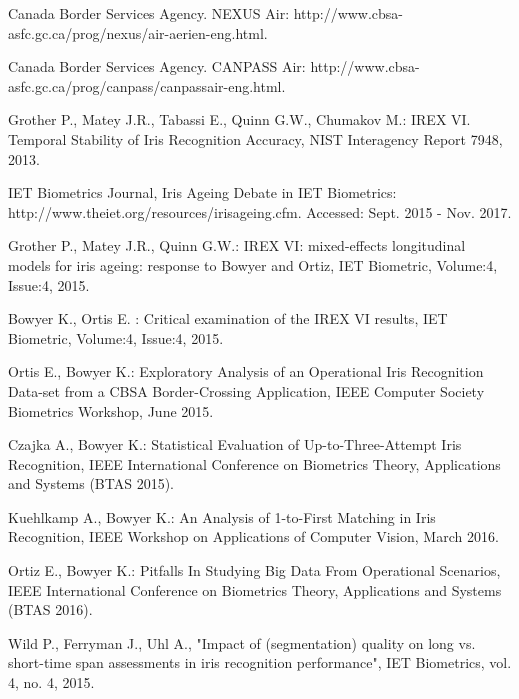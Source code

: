 
\begin{thebibliography}{9}



Canada Border Services Agency. NEXUS Air:
http://www.cbsa-asfc.gc.ca/prog/nexus/air-aerien-eng.html.

\bibitem{[kn:CANPASS]}
Canada Border Services Agency. CANPASS Air: 
http://www.cbsa-asfc.gc.ca/prog/canpass/canpassair-eng.html.


		Grother P., Matey J.R.,  Tabassi E., Quinn G.W., Chumakov M.: 
IREX VI. Temporal Stability of Iris Recognition Accuracy, NIST Interagency Report 7948, 2013.

IET Biometrics Journal, Iris Ageing Debate in IET Biometrics: http://www.theiet.org/resources/irisageing.cfm. 
Accessed:  Sept. 2015 - Nov. 2017.

		Grother P., Matey J.R., Quinn G.W.: 
IREX VI: mixed-effects longitudinal models for iris ageing: response to Bowyer and Ortiz, IET Biometric,  Volume:4, Issue:4, 2015.

		Bowyer K., Ortis E. : Critical examination of the IREX VI results,  IET Biometric,  Volume:4, Issue:4, 2015.



		Ortis E.,  Bowyer K.: Exploratory Analysis of an Operational Iris Recognition Data-set from a CBSA Border-Crossing Application, IEEE Computer Society Biometrics Workshop, June 2015.


		Czajka A., Bowyer K.: Statistical Evaluation of Up-to-Three-Attempt Iris Recognition, IEEE International Conference on Biometrics Theory, Applications and Systems (BTAS 2015).

		Kuehlkamp A., Bowyer K.: An Analysis of 1-to-First Matching in Iris Recognition, IEEE Workshop on Applications of Computer Vision, March 2016. 

	Ortiz E., Bowyer K.: Pitfalls In Studying Big Data From Operational Scenarios, IEEE International Conference on Biometrics Theory, Applications and Systems (BTAS 2016).


Wild P., Ferryman J., Uhl A., "Impact of (segmentation)
quality on long vs. short-time span assessments in iris recognition
performance",  IET Biometrics, vol. 4, no. 4, 2015.


\end{thebibliography}
